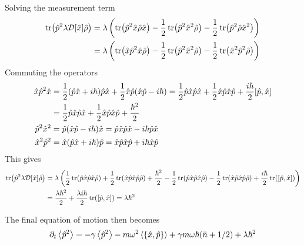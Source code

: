 Solving the measurement term
\begin{align}
    \tr(\hat{p}^2 \lambda \mathcal{D}[\hat{x}] \hat{\rho}) &= \lambda \left( \tr(\hat{p}^2 \hat{x} \hat{\rho} \hat{x}) - \frac{1}{2}\tr(\hat{p}^2 \hat{x}^2 \hat{\rho}) - \frac{1}{2} \tr(\hat{p}^2 \hat{\rho} \hat{x}^2) \right)\\
    &= \lambda \left( \tr(\hat{x} \hat{p}^2 \hat{x} \hat{\rho}) - \frac{1}{2} \tr(\hat{p}^2 \hat{x}^2 \hat{\rho}) - \frac{1}{2} \tr(\hat{x}^2 \hat{p}^2 \hat{\rho}) \right)
\end{align}
Commuting the operators
\begin{align}
    \xop \pop^2 \xop &= \frac{1}{2}(\pop\xop + i\hbar)\pop\xop + \frac{1}{2}\xop\pop(\xop\pop -i\hbar) = \frac{1}{2}\pop\xop\pop\xop + \frac{1}{2} \xop\pop\xop\pop + \frac{i\hbar}{2} \comm{\pop}{\xop}\\
    &=\frac{1}{2}\pop\xop\pop\xop + \frac{1}{2} \xop\pop\xop\pop +\frac{\hbar^2}{2}\\
    \pop^2 \xop^2 &= \pop (\xop\pop -i\hbar)\xop = \pop\xop\pop\xop - i\hbar \pop\xop\\
    \xop^2 \pop^2 &= \xop(\pop\xop + i\hbar)\pop = \xop\pop\xop\pop + i\hbar \xop\pop
\end{align}
This gives 
\begin{align}
    \tr(\pop^2 \lambda \super{\xop} \dmatrix) &= \lambda \left(  \frac{1}{2}\tr(\pop\xop\pop\xop \dmatrix) + \frac{1}{2} \tr(\xop\pop\xop\pop\dmatrix) + \frac{\hbar^2}{2} -\frac{1}{2}\tr(\pop\xop\pop\xop \dmatrix) - \frac{1}{2} \tr(\xop\pop\xop\pop\dmatrix) + \frac{i\hbar}{2}\tr(\comm{\pop}{\xop}) \right)\\
    &= \frac{\lambda \hbar^2}{2} + \frac{\lambda i \hbar}{2} \tr(\comm{\pop}{\xop}) = \lambda \hbar^2
\end{align}

The final equation of motion then becomes
\begin{equation}
    \dt\expval{\pop^2} = -\gamma \expval{\pop^2} - m\omega^2 \expval{\acomm{\xop}{\pop}} + \gamma m \omega\hbar (\nbar + 1/2) + \lambda \hbar^2
\end{equation}

